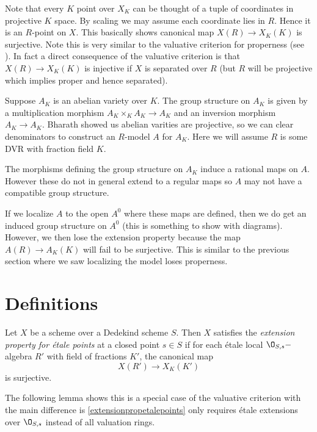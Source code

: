 \documentclass[11pt]{article}
\newcommand{\etale}{\'{e}tale }
\begin{document}
Note that every $K$ point over $X_K$ can be thought of a tuple of coordinates in projective $K$ space. By scaling we may assume each coordinate lies in $R$. Hence it is an $R$-point on $X$. This basically shows canonical map $X(R) \to X_K(K)$ is surjective. Note this is very similar to the valuative criterion for properness (see \cite[Thm.~II.4.7]{hartshorne1977algebraic}). In fact a direct consequence of the valuative criterion is that $X(R) \to X_K(K)$ is injective if $X$ is separated over $R$ (but $R$ will be projective which implies proper and hence separated).

Suppose $A_K$ is an abelian variety over $K$. The group structure on $A_K$ is given by a multiplication morphism $A_K\times_K A_K \to A_K$ and an inversion morphism $A_K \to A_K$. Bharath showed us abelian varities are projective, so we can clear denominators to construct an $R$-model $A$ for $A_K$. Here we will assume $R$ is some DVR with fraction field $K$.

The morphisms defining the group structure on $A_K$ induce a rational maps on $A$. However these do not in general extend to a regular maps so $A$ may not have a compatible group structure.

If we localize $A$ to the open $A^0$ where these maps are defined, then we do get an induced group structure on $A^0$ (this is something to show with diagrams). However, we then lose the extension property because the map $A(R) \to A_K(K)$ will fail to be surjective. This is similar to the previous section where we saw localizing the model loses properness.

\section{Definitions}

\begin{defn}\label{extensionpropetalepoints}
	Let $X$ be a scheme over a Dedekind scheme $S$. Then $X$ satisfies the \emph{extension property for \etale points} at a closed point $s\in S$ if for each \etale local $\O_{S,s}-$algebra $R'$ with field of fractions $K'$, the canonical map
	$$
		X(R') \to X_K(K')
	$$
	is surjective.
\end{defn}

The following lemma shows this is a special case of the valuative criterion with the main difference is \autoref{extensionpropetalepoints} only requires \etale extensions over $\O_{S,s}$ instead of all valuation rings.
\end{document}
